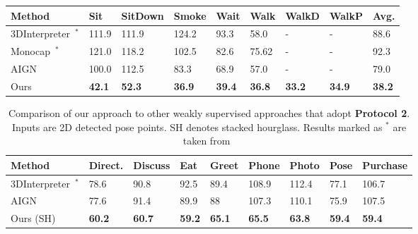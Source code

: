 \documentclass[runningheads]{llncs}
\makeatletter
\DeclareRobustCommand\onedot{\futurelet\@let@token\@onedot}
\def\@onedot{\ifx\@let@token.\else.\null\fi\xspace}
\def\etal{\emph{et al}\onedot}
\makeatother
\begin{document}
\begin{table*}[htb!]
\begin{tabularx}{\textwidth}{ l *{8}{Y} }
		\bottomrule
		\toprule	
		Method & Sit & SitDown & Smoke & Wait & Walk & WalkD & WalkP & Avg.\\
		\midrule
		3DInterpreter~\cite{InterpreterNetwork2016}$^{\ast}$ &111.9 & 111.9 & 124.2 & 93.3 & 58.0  & - & - & 88.6 \\
Monocap~\cite{MonoCap}$^{\ast}$ &  121.0 & 118.2 & 102.5 & 82.6 &  75.62 & - & - &  92.3  \\
AIGN~\cite{Tung_2017_ICCV} & 100.0 & 112.5 & 83.3 & 68.9 & 57.0 &  - & - &79.0 \\
Ours & {\bf 42.1}&	{\bf 52.3}&	{\bf 36.9}&	{\bf 39.4} & 	{\bf 36.8} &	{\bf 33.2}	&{\bf 34.9}&	{\bf 38.2}\\
			\bottomrule
\end{tabularx}
\end{table*}\begin{table*}[t]
		\caption{Comparison of our approach to other weakly supervised approaches that adopt \textbf{Protocol 2}. Inputs are 2D detected pose points. SH denotes stacked hourglass. Results marked as $^{\ast}$ are taken from~\cite{Tung_2017_ICCV}}
	\label{table:protocol2_sh}
	\centering
	\begin{tabularx}{\textwidth}{ l *{8}{Y} }
		\toprule
		Method & Direct. & Discuss & Eat & Greet & Phone & Photo & Pose & Purchase \\
		\midrule
		3DInterpreter~\cite{InterpreterNetwork2016}$^{\ast}$ & 78.6 & 90.8 & 92.5 & 89.4 & 108.9 & 112.4 &  77.1 & 106.7 \\
		AIGN~\cite{Tung_2017_ICCV}  &77.6 &  91.4 &  89.9 & 88 & 107.3 & 110.1 &  75.9 &  107.5 \\
		Ours (SH) & \textbf{60.2} &	 {\bf 60.7} &	\textbf{59.2} &	{\bf 65.1} & \textbf{65.5} &	{\bf 63.8}& \textbf{59.4} & \textbf{59.4}\\
		

\end{tabularx}
\end{table*}
\end{document}
